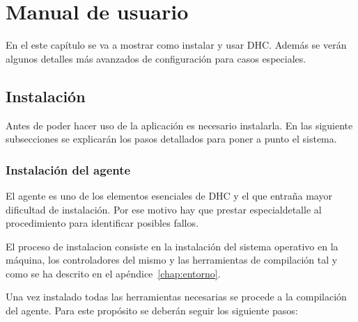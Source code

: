 \chapter{Manual de usuario} 

En el este capítulo se va a mostrar como instalar y usar DHC. Además se verán algunos detalles más avanzados de configuración para casos especiales.

\section{Instalación}

Antes de poder hacer uso de la aplicación es necesario instalarla. En las siguiente subsecciones se explicarán los pasos detallados para poner a punto el sistema.

\subsection{Instalación del agente}

El agente es uno de los elementos esenciales de DHC y el que entraña mayor dificultad de instalación. Por ese motivo hay que prestar especialdetalle al procedimiento para identificar posibles fallos.

El proceso de instalacion consiste en la instalación del sistema operativo en la máquina, los controladores del mismo y las herramientas de compilación tal y como se ha descrito en el apéndice~\ref{chap:entorno}.

Una vez instalado todas las herramientas necesarias se procede a la compilación del agente. Para este propósito se deberán seguir los siguiente pasos:

